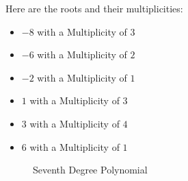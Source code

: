 \begin{question}[Without plotting any points other than intercepts, draw a
  possible graph of the following polynomial: \\
  $f(x) = (x + 8)^3(x + 6)^2 (x + 2)(x - 1)^3 (x - 3)^{4} (x - 6)$]
  
  Here are the roots and their multiplicities:

  \begin{itemize}
    \item $-8$ with a Multiplicity of $3$ \\
    \item $-6$ with a Multiplicity of $2$ \\
    \item $-2$ with a Multiplicity of $1$ \\
    \item $1$ with a Multiplicity of $3$ \\
    \item $3$ with a Multiplicity of $4$ \\
    \item $6$ with a Multiplicity of $1$ \\
  \end{itemize}
\end{question}

\begin{figure}[ht]
  \centering
  \caption{Seventh Degree Polynomial}
  \label{fig:seventh-degree-polynomial}
\end{figure}
